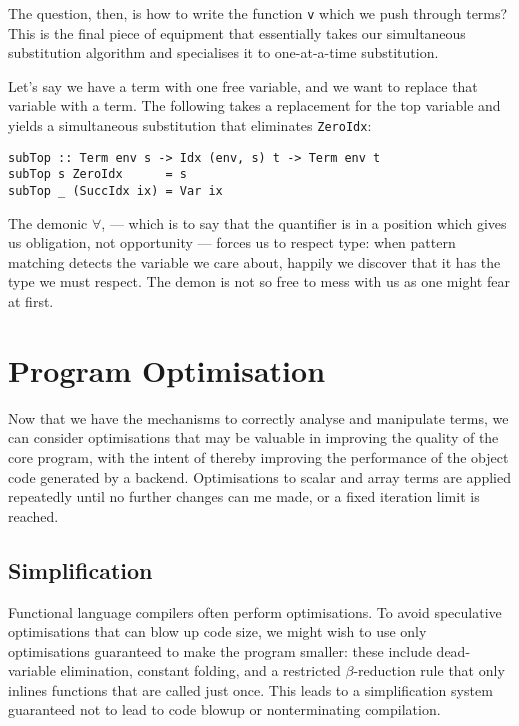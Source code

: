 The question, then, is how to write the function \texttt{v} which we push
through terms? This is the final piece of equipment that essentially takes our
simultaneous substitution algorithm and specialises it to one-at-a-time
substitution.

Let's say we have a term with one free variable, and we want to replace that
variable with a term. The following takes a replacement for the top variable and
yields a simultaneous substitution that eliminates \texttt{ZeroIdx}:
%
\begin{lstlisting}[style=haskell]
subTop :: Term env s -> Idx (env, s) t -> Term env t
subTop s ZeroIdx      = s
subTop _ (SuccIdx ix) = Var ix
\end{lstlisting}
%
The demonic $\forall$, --- which is to say that the quantifier is in a position
which gives us obligation, not opportunity --- forces us to respect type: when
pattern matching detects the variable we care about, happily we discover that it
has the type we must respect. The demon is not so free to mess with us as one
might fear at first.




\section{Program Optimisation}

Now that we have the mechanisms to correctly analyse and manipulate terms, we
can consider optimisations that may be valuable in improving the quality of the
core program, with the intent of thereby improving the performance of the object
code generated by a backend. Optimisations to scalar and array terms are applied
repeatedly until no further changes can me made, or a fixed iteration limit is
reached.


\subsection{Simplification}

Functional language compilers often perform optimisations. To avoid speculative
optimisations that can blow up code size, we might wish to use only
optimisations guaranteed to make the program smaller: these include
dead-variable elimination, constant folding, and a restricted $\beta$-reduction
rule that only inlines functions that are called just once. This leads to a
simplification system guaranteed not to lead to code blowup or nonterminating
compilation.


